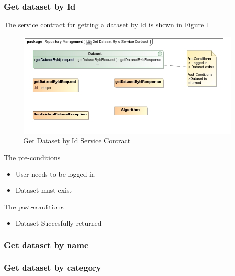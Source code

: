 \subsubsection {Get dataset by Id}
The service contract for getting a dataset by Id is shown in Figure \ref{fig:getDatasetByIdService}
\begin{figure}[H]
  \begin{center}
  \includegraphics[scale=0.6]{../Diagrams and Charts/Test Data/Get Dataset By Id Service Contract.jpg}
  \caption{Get Dataset by Id Service Contract}
  \label{fig:getDatasetByIdService}
  \end{center}
  
\end{figure}

The pre-conditions
\begin{itemize}
  \item User needs to be logged in
  \item Dataset must exist
\end{itemize}

The post-conditions
\begin{itemize}
  \item Dataset Succesfully returned
\end{itemize}

\subsubsection {Get dataset by name}
\subsubsection {Get dataset by category}
